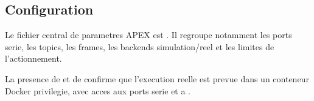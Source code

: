 \subsection{Configuration}

Le fichier central de parametres APEX est . Il regroupe notamment les ports serie, les topics, les frames, les backends simulation/reel et les limites de l'actionnement.

La presence de  et de  confirme que l'execution reelle est prevue dans un conteneur Docker privilegie, avec acces aux ports serie et a .

